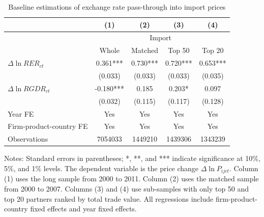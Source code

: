 \documentclass[12pt]{article}
\begin{document}
\begin{table}[htbp]
	\centering
	\caption{Baseline estimations of exchange rate pass-through into import prices}
	\begin{threeparttable}
		\begin{tabular}{lcccc}
			\toprule
			& (1)   & (2)   & (3)   & (4) \\
			\midrule
			& \multicolumn{4}{c}{Import} \\
			& Whole & Matched & Top 50 & Top 20 \\
			\midrule
			$\Delta \ln RER_{ct}$ & 0.361*** & 0.730*** & 0.720*** & 0.653*** \\
			& (0.033) & (0.033) & (0.033) & (0.035) \\
			$\Delta \ln RGDR_{ct}$ & -0.180*** & 0.185 & 0.203* & 0.097 \\
			& (0.032) & (0.115) & (0.117) & (0.128) \\
			Year FE  & Yes   & Yes   & Yes   & Yes \\
			Firm-product-country FE & Yes   & Yes   & Yes   & Yes \\
			Observations & 7054033 & 1449210 & 1439306 & 1343239 \\
			\bottomrule
		\end{tabular}
		\begin{tablenotes}
			\footnotesize
			\item[Notes:] Standard errors in parentheses; *, **, and *** indicate significance at 10\%, 5\%, and 1\% levels. The dependent variable is the price change $\Delta \ln P_{ijct}$. Column (1) uses the long sample from 2000 to 2011. Column (2) uses the matched sample from 2000 to 2007. Columns (3) and (4) use sub-samples with only top 50 and top 20 partners ranked by total trade value. All regressions include firm-product-country fixed effects and year fixed effects. 
		\end{tablenotes}
	\end{threeparttable}
	\label{tab.baseline}
\end{table}
\end{document}
